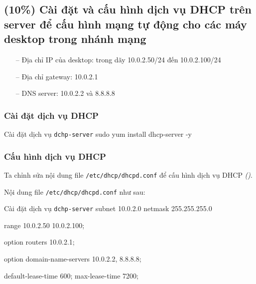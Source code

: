 \subsection{(10\%) Cài đặt và cấu hình dịch vụ DHCP trên server để cấu hình mạng tự động
  cho các máy desktop trong nhánh mạng}

\begin{itemize}
  \item[--] Địa chỉ IP của desktop: trong dãy 10.0.2.50/24 đến 10.0.2.100/24
  \item[--] Địa chỉ gateway:  10.0.2.1
  \item[--] DNS server: 10.0.2.2 và 8.8.8.8
\end{itemize}

\subsubsection{Cài đặt dịch vụ DHCP}

\vspace{0.5cm}
\begin{bashlisting}{Cài đặt dịch vụ \texttt{dchp-server}}
  sudo yum install dhcp-server -y
\end{bashlisting}

\subsubsection{Cấu hình dịch vụ DHCP}

Ta chỉnh sửa nội dung file \texttt{/etc/dhcp/dhcpd.conf} để cấu hình dịch vụ DHCP
\textit{()}.


Nội dung file \texttt{/etc/dhcp/dhcpd.conf} như sau:

\vspace{0.5cm}
\begin{bashlisting}{Cài đặt dịch vụ \texttt{dchp-server}}
  subnet 10.0.2.0 netmask 255.255.255.0 {
      range 10.0.2.50 10.0.2.100;

      option routers 10.0.2.1;

      option domain-name-servers 10.0.2.2, 8.8.8.8;

      default-lease-time 600;
      max-lease-time 7200;
    }
\end{bashlisting}

